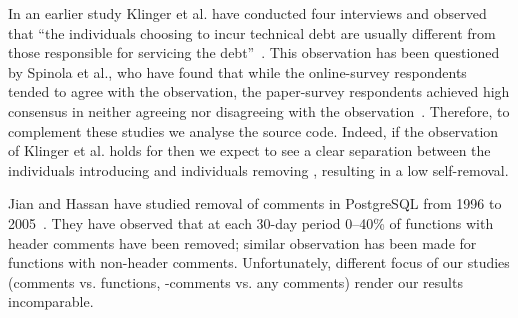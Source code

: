 In an earlier study Klinger et al. have conducted four interviews and observed that ``the individuals choosing to incur technical debt are usually different from those responsible for servicing the debt''~\cite{Klinger:etal}. 
This observation has been questioned by Spinola et al., who have found that while the online-survey respondents tended to agree with the observation,
the paper-survey respondents achieved high consensus in neither agreeing nor disagreeing with the observation~\cite{Spinola:etal}.
Therefore, to complement these studies we analyse the source code.
Indeed, if the observation of Klinger et al. holds for \SATD then we expect to see a clear separation between the individuals introducing \SATD and
individuals removing \SATD, resulting in a low \SATD self-removal.

Jian and Hassan have studied removal of comments in PostgreSQL from 1996 to 2005~\cite{Jiang:Hassan}. 
They have observed that at each 30-day period 0--40\% of functions with header comments have been removed; similar observation has been made for functions with non-header comments. 
Unfortunately, different focus of our studies (comments vs. functions, \SATD-comments vs. any comments) render our results incomparable.
